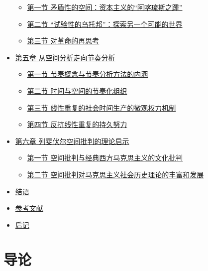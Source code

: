 \documentclass[UTF8, fontset = sourcesans, a4paper, oneside, zihao =
-4, scheme=chinese, no-math, space=true]{ctexbook}
\newcommand{\tightlist}{%
  \setlength{\itemsep}{0pt}\setlength{\parskip}{0pt}}
\begin{document}
\begin{itemize}
  \begin{itemize}
  \tightlist
  \item
    \protect\hyperlink{part0008_split_001.htmlux5cux23b011}{第一节
    矛盾性的空间：资本主义的``阿喀琉斯之踵''}
  \item
    \protect\hyperlink{part0008_split_002.htmlux5cux23b012}{第二节
    ``试验性的乌托邦''：探索另一个可能的世界}
  \item
    \protect\hyperlink{part0008_split_003.htmlux5cux23b013}{第三节
    对革命的再思考}
  \end{itemize}
\item
  \protect\hyperlink{part0009_split_000.htmlux5cux23a009}{第五章
  从空间分析走向节奏分析}

  \begin{itemize}
  \tightlist
  \item
    \protect\hyperlink{part0009_split_001.htmlux5cux23b014}{第一节
    节奏概念与节奏分析方法的内涵}
  \item
    \protect\hyperlink{part0009_split_002.htmlux5cux23b015}{第二节
    时间与空间的节奏化组织}
  \item
    \protect\hyperlink{part0009_split_003.htmlux5cux23b016}{第三节
    线性重复的社会时间生产的微观权力机制}
  \item
    \protect\hyperlink{part0009_split_004.htmlux5cux23b017}{第四节
    反抗线性重复的持久努力}
  \end{itemize}
\item
  \protect\hyperlink{part0010_split_000.htmlux5cux23a010}{第六章
  列斐伏尔空间批判的理论启示}

  \begin{itemize}
  \tightlist
  \item
    \protect\hyperlink{part0010_split_001.htmlux5cux23b018}{第一节
    空间批判与经典西方马克思主义的文化批判}
  \item
    \protect\hyperlink{part0010_split_002.htmlux5cux23b019}{第二节
    空间批判对马克思主义社会历史理论的丰富和发展}
  \end{itemize}
\item
  \protect\hyperlink{part0011.htmlux5cux23a011}{结语}
\item
  \protect\hyperlink{part0012.htmlux5cux23a012}{参考文献}
\item
  \protect\hyperlink{part0013.htmlux5cux23a013}{后记}
\end{itemize}

\protect\hypertarget{part0004.html}{}{}

\hypertarget{part0004.htmlux5cux23a004}{\chapter{导论}\label{part0004.htmlux5cux23a004}}
\end{document}
